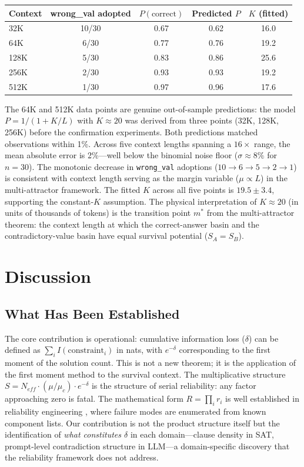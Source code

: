 \documentclass[11pt,a4paper]{article}
\begin{document}
\begin{center}
\begin{tabular}{lcccc}
\toprule
Context & wrong\_val adopted & $P(\text{correct})$ & Predicted $P$ & $K$ (fitted) \\
\midrule
32K  & 10/30 & 0.67 & 0.62 & 16.0 \\
64K  &  6/30 & 0.77 & 0.76 & 19.2 \\
128K &  5/30 & 0.83 & 0.86 & 25.6 \\
256K &  2/30 & 0.93 & 0.93 & 19.2 \\
512K &  1/30 & 0.97 & 0.96 & 17.6 \\
\bottomrule
\end{tabular}
\end{center}

\noindent The 64K and 512K data points are genuine out-of-sample predictions: the model $P = 1/(1 + K/L)$ with $K \approx 20$ was derived from three points (32K, 128K, 256K) before the confirmation experiments. Both predictions matched observations within 1\%. Across five context lengths spanning a $16\times$ range, the mean absolute error is 2\%---well below the binomial noise floor ($\sigma \approx 8\%$ for $n = 30$). The monotonic decrease in \texttt{wrong\_val} adoptions ($10 \to 6 \to 5 \to 2 \to 1$) is consistent with context length serving as the margin variable ($\mu \propto L$) in the multi-attractor framework. The fitted $K$ across all five points is $19.5 \pm 3.4$, supporting the constant-$K$ assumption. The physical interpretation of $K \approx 20$ (in units of thousands of tokens) is the transition point $m^*$ from the multi-attractor theorem: the context length at which the correct-answer basin and the contradictory-value basin have equal survival potential ($S_A = S_B$).

\section{Discussion}
\label{sec:discussion}

\subsection{What Has Been Established}

The core contribution is operational: cumulative information loss ($\delta$) can be defined as $\sum_i I(\text{constraint}_i)$ in nats, with $e^{-\delta}$ corresponding to the first moment of the solution count. This is not a new theorem; it is the application of the first moment method \citep{alon2016} to the survival context. The multiplicative structure $S = N_{eff} \cdot (\mu/\mu_c) \cdot e^{-\delta}$ is the structure of serial reliability: any factor approaching zero is fatal. The mathematical form $R = \prod_i r_i$ is well established in reliability engineering \citep{barlow1975}, where failure modes are enumerated from known component lists. Our contribution is not the product structure itself but the identification of \emph{what constitutes $\delta$} in each domain---clause density in SAT, prompt-level contradiction structure in LLM---a domain-specific discovery that the reliability framework does not address.
\end{document}
